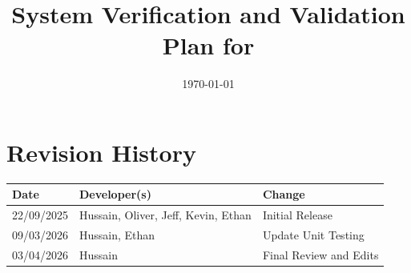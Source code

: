 \documentclass[12pt, titlepage]{article}
\begin{document}
\title{System Verification and Validation Plan for \progname{}}
\author{\authname}
\date{\today}

\maketitle


\section*{Revision History}

\begin{tabularx}{\textwidth}{llX}
\toprule {\bf Date} & {\bf Developer(s)} & {\bf Change}\\
\midrule
22/09/2025 & Hussain, Oliver, Jeff, Kevin, Ethan & Initial Release\\
09/03/2026 & Hussain, Ethan & Update Unit Testing\\
03/04/2026 & Hussain & Final Review and Edits\\
\bottomrule
\end{tabularx}

~\\


\newpage

\tableofcontents

\listoftables



\newpage
\end{document}
